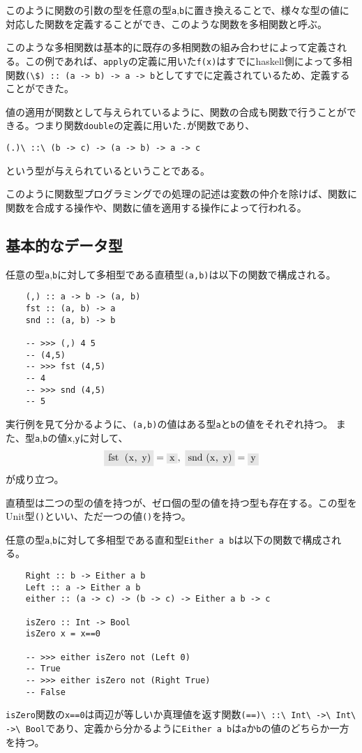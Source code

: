 \documentclass[uplatex,dvipdfmx]{jsarticle}
\newcommand{\pr}[1]{\colorbox[rgb]{0.9,0.9,0.9}{\lstinline{#1}}}
\begin{document}
  このように関数の引数の型を任意の型\pr{a},\pr{b}に置き換えることで、様々な型の値に対応した関数を定義することができ、このような関数を多相関数と呼ぶ。

  このような多相関数は基本的に既存の多相関数の組み合わせによって定義される。この例であれば、\pr{apply}の定義に用いた\pr{f(x)}はすでにhaskell側によって多相関数\pr{(\$) :: (a -> b) -> a -> b}としてすでに定義されているため、定義することができた。

  値の適用が関数として与えられているように、関数の合成も関数で行うことができる。つまり関数\pr{double}の定義に用いた\pr{.}が関数であり、
  \begin{center}
    \pr{(.)\ ::\ (b -> c) -> (a -> b) -> a -> c}
  \end{center}
  という型が与えられているということである。

  このように関数型プログラミングでの処理の記述は変数の仲介を除けば、関数に関数を合成する操作や、関数に値を適用する操作によって行われる。
  \subsection{基本的なデータ型}
  任意の型\pr{a},\pr{b}に対して多相型である直積型\pr{(a,b)}は以下の関数で構成される。
  \begin{lstlisting}
    (,) :: a -> b -> (a, b)
    fst :: (a, b) -> a
    snd :: (a, b) -> b

    -- >>> (,) 4 5
    -- (4,5)
    -- >>> fst (4,5)
    -- 4
    -- >>> snd (4,5)
    -- 5
  \end{lstlisting}
  実行例を見て分かるように、\pr{(a,b)}の値はある型\pr{a}と\pr{b}の値をそれぞれ持つ。
  また、型\pr{a},\pr{b}の値\pr{x},\pr{y}に対して、\[\pr{fst (x, y)}=\pr{x},\ \pr{snd (x, y)}=\pr{y}\]が成り立つ。

  直積型は二つの型の値を持つが、ゼロ個の型の値を持つ型も存在する。この型をUnit型\pr{()}といい、ただ一つの値\pr{()}を持つ。

  任意の型\pr{a},\pr{b}に対して多相型である直和型\pr{Either a b}は以下の関数で構成される。
  \begin{lstlisting}
    Right :: b -> Either a b
    Left :: a -> Either a b
    either :: (a -> c) -> (b -> c) -> Either a b -> c

    isZero :: Int -> Bool
    isZero x = x==0

    -- >>> either isZero not (Left 0)
    -- True
    -- >>> either isZero not (Right True)
    -- False
  \end{lstlisting}
  \pr{isZero}関数の\pr{x==0}は両辺が等しいか真理値を返す関数\pr{(==)\ ::\ Int\ ->\ Int\ ->\ Bool}であり、定義から分かるように\pr{Either a b}は\pr{a}か\pr{b}の値のどちらか一方を持つ。
\end{document}
